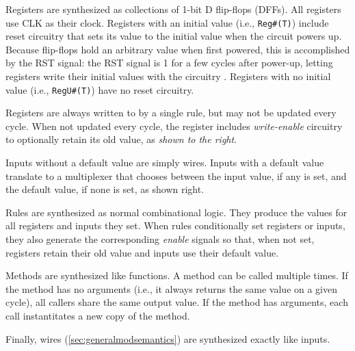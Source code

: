 Registers are synthesized as collections of 1-bit D flip-flops (DFFs).
All registers use CLK as their clock.
Registers with an initial value (i.e., \verb|Reg#(T)|) include reset circuitry
that sets its value to the initial value when the circuit powers up.
Because flip-flops hold an arbitrary value when first powered, this is accomplished by
the RST signal: the RST signal is 1 for a few cycles after power-up,
letting registers write their initial values with the circuitry .
Registers with no initial value (i.e., \verb|RegU#(T)|) have no reset circuitry.

Registers are always written to by a single rule, but may not be updated every cycle.
When not updated every cycle, the register includes \emph{write-enable} circuitry
to optionally retain its old value, as \emph{shown to the right}.


Inputs without a default value are simply wires.
Inputs with a default value translate to a multiplexer that chooses between
the input value, if any is set, and the default value, if none is set, as shown right.

Rules are synthesized as normal combinational logic.
They produce the values for all registers and inputs they set.
When rules conditionally set registers or inputs,
they also generate the corresponding \emph{enable} signals
so that, when not set, registers retain their old value
and inputs use their default value.

Methods are synthesized like functions.
A method can be called multiple times. If the method has no arguments
(i.e., it always returns the same value on a given cycle),
all callers share the same output value. If the method has arguments,
each call instantitates a new copy of the method.

Finally, wires (\autoref{sec:generalmodsemantics})
are synthesized exactly like inputs.

